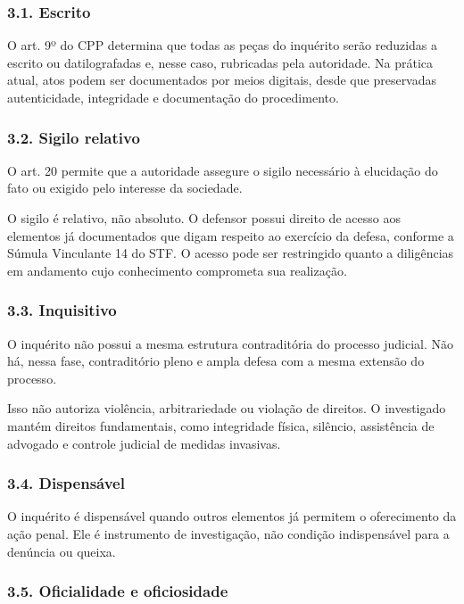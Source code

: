 \documentclass[11pt,a4paper]{article}
\begin{document}
\subsubsection*{3.1. Escrito}

O art. 9º do CPP determina que todas as peças do inquérito serão reduzidas a escrito ou datilografadas e, nesse caso, rubricadas pela autoridade. Na prática atual, atos podem ser documentados por meios digitais, desde que preservadas autenticidade, integridade e documentação do procedimento.

\subsubsection*{3.2. Sigilo relativo}

O art. 20 permite que a autoridade assegure o sigilo necessário à elucidação do fato ou exigido pelo interesse da sociedade.

O sigilo é relativo, não absoluto. O defensor possui direito de acesso aos elementos já documentados que digam respeito ao exercício da defesa, conforme a Súmula Vinculante 14 do STF. O acesso pode ser restringido quanto a diligências em andamento cujo conhecimento comprometa sua realização.

\subsubsection*{3.3. Inquisitivo}

O inquérito não possui a mesma estrutura contraditória do processo judicial. Não há, nessa fase, contraditório pleno e ampla defesa com a mesma extensão do processo.

Isso não autoriza violência, arbitrariedade ou violação de direitos. O investigado mantém direitos fundamentais, como integridade física, silêncio, assistência de advogado e controle judicial de medidas invasivas.

\subsubsection*{3.4. Dispensável}

O inquérito é dispensável quando outros elementos já permitem o oferecimento da ação penal. Ele é instrumento de investigação, não condição indispensável para a denúncia ou queixa.

\subsubsection*{3.5. Oficialidade e oficiosidade}
\end{document}
